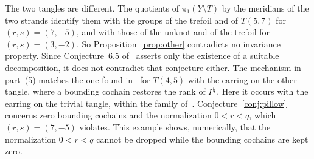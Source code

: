 \begin{remark}
The two tangles are different. The quotients of $\pi_1(Y\setminus T)$ by the meridians of the two strands identify
them with the groups of the trefoil and of $T(5,7)$ for $(r,s)=(7,-5)$, and with those of the unknot and of the
trefoil for $(r,s)=(3,-2)$. So Proposition~\ref{prop:other} contradicts no invariance property. Since
Conjecture~6.5 of~\cite{HHK2} asserts only the existence of a suitable decomposition, it does not contradict that
conjecture either. The mechanism in part~(5) matches the one found in~\cite[\S10.3]{CHKK} for $T(4,5)$ with the
earring on the other tangle, where a bounding cochain restores the rank of $I^{\natural}$. Here it occurs with the
earring on the trivial tangle, within the family of~\cite[\S10]{HHK2}. Conjecture~\ref{conj:pillow} concerns zero
bounding cochains and the normalization $0<r<q$, which $(r,s)=(7,-5)$ violates. This example shows, numerically, that
the normalization $0<r<q$ cannot be dropped while the bounding cochains are kept zero.
\end{remark}
